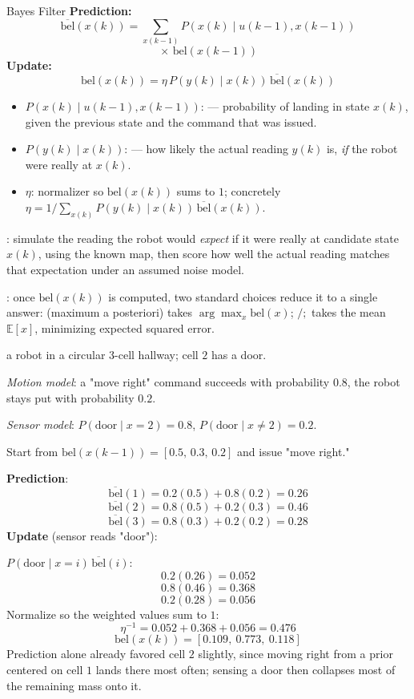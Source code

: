 \begin{defbox}{Bayes Filter}
\textbf{Prediction:}
\[
\overline{\mathrm{bel}}(x(k))=\sum_{x(k-1)} P(x(k)\mid u(k{-}1),x(k{-}1))
\]
\[
{}\times\,\mathrm{bel}(x(k-1))
\]
\textbf{Update:}
\[
\mathrm{bel}(x(k))=\eta\, P(y(k)\mid x(k))\,\overline{\mathrm{bel}}(x(k))
\]
\end{defbox}
\begin{itemize}
\item $P(x(k)\mid u(k{-}1),x(k{-}1))$:  --- probability of landing in state $x(k)$, given the previous state and the command that was issued.
\item $P(y(k)\mid x(k))$:  --- how likely the actual reading $y(k)$ is, \emph{if} the robot were really at $x(k)$.
\item $\eta$: normalizer so $\mathrm{bel}(x(k))$ sums to $1$; concretely $\eta=1\big/\sum_{x(k)}P(y(k)\mid x(k))\,\overline{\mathrm{bel}}(x(k))$.
\end{itemize}
\begin{notebox}
: simulate the reading the robot would \emph{expect} if it were really at candidate state $x(k)$, using the known map, then score how well the actual reading matches that expectation under an assumed noise model.

: once $\mathrm{bel}(x(k))$ is computed, two standard choices reduce it to a single answer:  (maximum a posteriori) takes $\arg\max_{x}\mathrm{bel}(x)$; $/;$  takes the mean $\mathbb E[x]$, minimizing expected squared error.
\end{notebox}

 a robot in a circular 3-cell hallway; cell $2$ has a door. 

\textit{Motion model}: a "move right" command succeeds with probability $0.8$, the robot stays put with probability $0.2$. 

\textit{Sensor model}: $P(\text{door}\mid x{=}2)=0.8$, $P(\text{door}\mid x{\ne}2)=0.2$.

Start from $\mathrm{bel}(x(k{-}1))=[0.5,\,0.3,\,0.2]$ and issue "move right."

\textbf{Prediction}:
\[
\overline{\mathrm{bel}}(1)=0.2(0.5)+0.8(0.2)=0.26
\]
\[
\overline{\mathrm{bel}}(2)=0.8(0.5)+0.2(0.3)=0.46
\]
\[
\overline{\mathrm{bel}}(3)=0.8(0.3)+0.2(0.2)=0.28
\]
\textbf{Update} (sensor reads "door"): 

$P(\text{door}\mid x{=}i)\,\overline{\mathrm{bel}}(i)$:
\[
0.2(0.26)=0.052
\]
\[
0.8(0.46)=0.368
\]
\[
0.2(0.28)=0.056
\]
Normalize so the weighted values sum to $1$:
\[
\eta^{-1}=0.052+0.368+0.056=0.476
\]
\[
\mathrm{bel}(x(k))= [0.109,\ 0.773,\ 0.118]
\]
Prediction alone already favored cell $2$ slightly, since moving right from a prior centered on cell $1$ lands there most often; sensing a door then collapses most of the remaining mass onto it.

